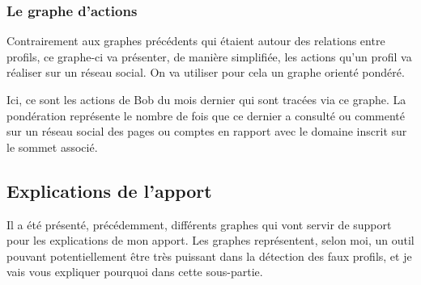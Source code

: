 \documentclass[12pt]{report}
\begin{document}
\subsubsection{Le graphe d'actions}
Contrairement aux graphes précédents qui étaient autour des relations entre profils, ce graphe-ci va présenter, de manière simplifiée, les actions qu'un profil va réaliser sur un réseau social. On va utiliser pour cela un graphe orienté pondéré.
\begin{center}
\end{center}
Ici, ce sont les actions de Bob du mois dernier qui sont tracées via ce graphe. La pondération représente le nombre de fois que ce dernier a consulté ou commenté sur un réseau social des pages ou comptes en rapport avec le domaine inscrit sur le sommet associé. 

\subsection{Explications de l'apport}
Il a été présenté, précédemment, différents graphes qui vont servir de support pour les explications de mon apport. Les graphes représentent, selon moi, un outil pouvant potentiellement être très puissant dans la détection des faux profils, et je vais vous expliquer pourquoi dans cette sous-partie.
\end{document}
